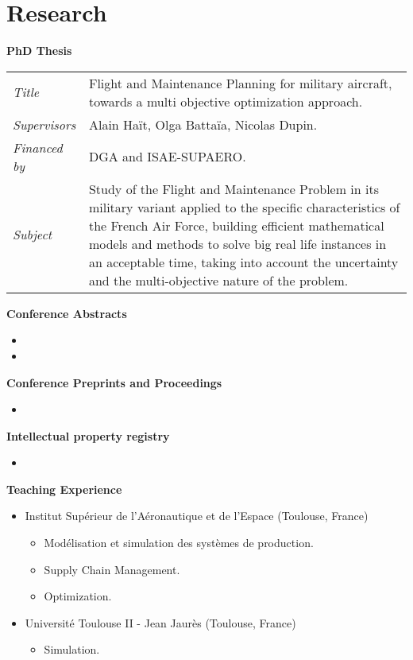 \section{Research}

    \textbf{PhD Thesis}\\

        \begin{tabular}{p{20mm}p{130mm}}
        \textsl{Title}         &  Flight and Maintenance Planning for military aircraft, towards a multi objective optimization approach.\\
        \textsl{Supervisors}   &  Alain Ha{\"i}t, Olga Batta{\"i}a, Nicolas Dupin. \\
        \textsl{Financed by}   &  DGA and ISAE-SUPAERO. \\
        \textsl{Subject}       &  Study of the Flight and Maintenance Problem in its military variant applied to the specific characteristics of the French Air Force, building efficient mathematical models and methods to solve big real life instances in an acceptable time, taking into account the uncertainty and the multi-objective nature of the problem. \\
    \end{tabular}

    \textbf{Conference Abstracts}
    
    \begin{itemize}
        \item {}
        \item {}
    \end{itemize}

\textbf{Conference Preprints and Proceedings}
    
    \begin{itemize}
        \item {}
    \end{itemize}

\textbf{Intellectual property registry}

    \begin{itemize}
        \item {}
    \end{itemize}

\textbf{Teaching Experience}

    \begin{itemize}
        \item Institut Supérieur de l'Aéronautique et de l'Espace (Toulouse, France)
        \begin{itemize}
            \item Modélisation et simulation des systèmes de production.
            \item Supply Chain Management.
            \item Optimization.
        \end{itemize}
        \item Université Toulouse II - Jean Jaurès (Toulouse, France)
        \begin{itemize}
            \item Simulation.
        \end{itemize}
    \end{itemize}
